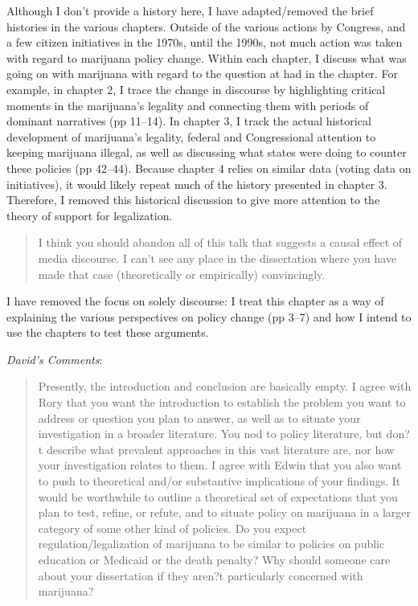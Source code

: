 \documentclass[12pt,stdletter,dateno,sigleft]{newlfm} %
\begin{document}
\begin{newlfm}
Although I don't provide a history here, I have adapted/removed the brief histories in the various chapters. Outside of the various actions by Congress, and a few citizen initiatives in the 1970s, until the 1990s, not much action was taken with regard to marijuana policy change. Within each chapter, I discuss what was going on with marijuana with regard to the question at had in the chapter. For example, in chapter 2, I trace the change in discourse by highlighting critical moments in the marijuana's legality and connecting them with periods of dominant narratives (pp 11--14). In chapter 3, I track the actual historical development of marijuana's legality, federal and Congressional attention to keeping marijuana illegal, as well as discussing what states were doing to counter these policies (pp 42--44). Because chapter 4 relies on similar data (voting data on initiatives), it would likely repeat much of the history presented in chapter 3. Therefore, I removed this historical discussion to give more attention to the theory of support for legalization.



\begin{quotation}{\color{red}\noindent \footnotesize
I think you should abandon all of this talk that suggests a causal effect of media discourse.  I can't see any place in the dissertation where you have made that case (theoretically or empirically) convincingly.
}
\end{quotation}




I have removed the focus on solely discourse: I treat this chapter as a way of explaining the various perspectives on policy change (pp 3--7) and how I intend to use the chapters to test these arguments. \newline 



\textit{David's Comments}:

\begin{quotation}{\color{red}\noindent \footnotesize
Presently, the introduction and conclusion are basically empty. I agree with Rory that you want the introduction to establish the problem you want to address or question you plan to answer, as well as to situate your investigation in a broader literature. You nod to policy literature, but don?t describe what prevalent approaches in this vast literature are, nor how your investigation relates to them. I agree with Edwin that you also want to push to theoretical and/or substantive implications of your findings. It would be worthwhile to outline a theoretical set of expectations that you plan to test, refine, or refute, and to situate policy on marijuana in a larger category of some other kind of policies. Do you expect regulation/legalization of marijuana to be similar to policies on public education or Medicaid or the death penalty? Why should someone care about your dissertation if they aren?t particularly concerned with marijuana?
}
\end{quotation}


\end{newlfm}
\end{document}
